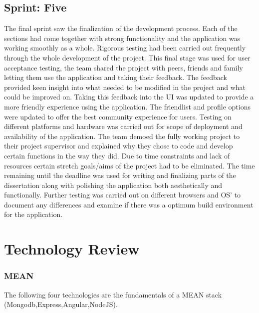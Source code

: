 \section{Sprint: Five}
The final sprint saw the finalization of the development process. Each of the sections had come together with strong functionality and the application was working smoothly as a whole. Rigorous testing had been carried out frequently through the whole development of the project. This final stage was used for user acceptance testing, the team shared the project with peers, friends and family letting them use the application and taking their feedback. The feedback provided keen insight into what needed to be modified in the project and what could be improved on. Taking this feedback into the UI was updated to provide a more friendly experience using the application. The friendlist and profile options were updated to offer the best community experience for users. Testing on different platforms and hardware was carried out for scope of deployment and availability of the application. The team demoed the fully working project to their project supervisor and explained why they chose to code and develop certain functions in the way they did. Due to time constraints and lack of resources certain stretch goals/aims of the project had to be eliminated. The time remaining until the deadline was used for writing and finalizing parts of the dissertation along with polishing the application both aesthetically and functionally. Further testing was carried out on different browsers and OS' to document any differences and examine if there was a optimum build environment for the application. 


\chapter{Technology Review}
\subsection{MEAN}
The following four technologies are the fundamentals of a MEAN stack (Mongodb,Express,Angular,NodeJS).


